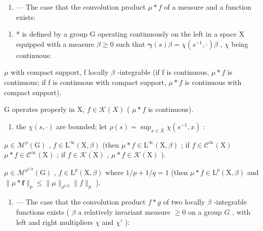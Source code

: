 \begin{enumerate}
\def\labelenumi{\Roman{enumi}.}
\setcounter{enumi}{1}
\tightlist
\item
  --- The case that the convolution product \(\mu*f\) of a measure and a function exists:
\end{enumerate}

\begin{enumerate}
\def\labelenumi{(\alph{enumi})}
\tightlist
\item
  * is defined by a group G operating continuously on the left in a space X equipped with a measure \(\beta \geqslant 0\) such that \(\pmb{\gamma}(s)\beta = \chi(s^{-1},\cdot)\beta\) , \(\chi\) being continuous:
\end{enumerate}

\(\mu\) with compact support, f locally \(\beta\) -integrable (if f is continuous, \(\mu * f\) is continuous; if f is continuous with compact support, \(\mu * f\) is continuous with compact support).

G operates properly in X, \(f \in \mathcal{K}(X)\) ( \(\mu * f\) is continuous).

\begin{enumerate}
\def\labelenumi{(\alph{enumi})}
\setcounter{enumi}{1}
\tightlist
\item
  the \(\chi(s, \cdot)\) are bounded; let \(\rho(s) = \sup_{x \in X} \chi(s^{-1}, x)\) :
\end{enumerate}

\(\mu \in \mathcal{M}^{\rho}(\mathrm{G})\) , \(f\in \mathrm{L}^{\infty}(\mathrm{X},\beta)\) (then \(\mu *f\in \mathrm{L}^{\infty}(\mathrm{X},\beta)\) ; if \(f\in \mathcal{C}^{\infty}(\mathrm{X})\) \(\mu *f\in \mathcal{C}^{\infty}(\mathrm{X})\) ; if \(f\in \overline{\mathcal{K}(\mathrm{X})}\) , \(\mu *f\in \overline{\mathcal{K}(\mathrm{X})}\) ).

\(\mu \in \mathcal{M}^{\rho^{1 / q}}(\mathrm{G})\) , \(f\in \mathrm{L}^p (\mathrm{X},\beta)\) where \(1 / p + 1 / q = 1\) (then \(\mu *f\in \mathrm{L}^p (\mathrm{X},\beta)\) and \(\| \mu *\boldsymbol {f}\| _p\leqslant \| \mu \|_{\rho^{1 / q}}\| f\| _p\) ).

\begin{enumerate}
\def\labelenumi{\Roman{enumi}.}
\setcounter{enumi}{2}
\tightlist
\item
  --- The case that the convolution product \(f * g\) of two locally \(\beta\) -integrable functions exists ( \(\beta\) a relatively invariant measure \(\geqslant 0\) on a group \(G\) , with left and right multipliers \(\chi\) and \(\chi'\) ):
\end{enumerate}

